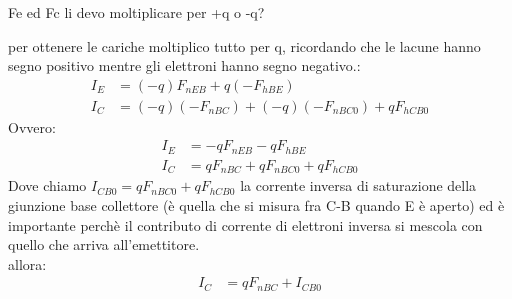 \begin{ricevimento}
    Fe ed Fc li devo moltiplicare per +q o -q?
\end{ricevimento}
per ottenere le cariche moltiplico tutto per q, ricordando che le lacune hanno segno positivo mentre gli elettroni hanno segno negativo.:
\begin{align}
I_E &= (-q)F_{nEB}+q(-F_{hBE})\\
    I_C &= (-q)(-F_{nBC})+(-q)(-F_{nBC0})+qF_{hCB0}
\end{align}
Ovvero:
\begin{align}
I_E &= -qF_{nEB}-qF_{hBE}\\
    I_C &= qF_{nBC}+qF_{nBC0}+qF_{hCB0}
\end{align}
Dove chiamo $I_{CB0}=qF_{nBC0}+qF_{hCB0}$ la corrente inversa di saturazione della giunzione base collettore (è quella che si misura fra C-B quando E è aperto) ed è importante perchè il contributo di corrente di elettroni inversa si mescola con quello che arriva all'emettitore.\\ allora:
\begin{align}
    I_C &= qF_{nBC}+I_{CB0}
\end{align}
   
